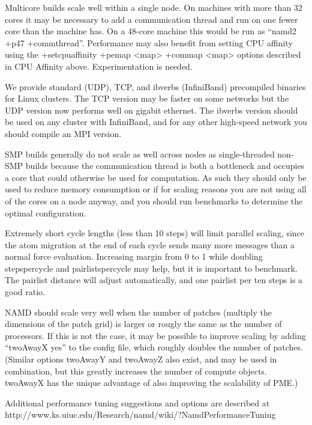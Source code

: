 Multicore builds scale well within a single node.  On machines with more
than 32 cores it may be necessary to add a communication thread and run
on one fewer core than the machine has.  On a 48-core machine this would
be run as ``namd2 +p47 +commthread''.  Performance may also benefit from
setting CPU affinity using the +setcpuaffinity +pemap <map> +commap <map>
options described in CPU Affinity above.  Experimentation is needed.

We provide standard (UDP), TCP, and ibverbs (InfiniBand) precompiled
binaries for Linux clusters.  The TCP version may be faster on some
networks but the UDP version now performs well on gigabit ethernet.
The ibverbs version should be used on any cluster with InfiniBand,
and for any other high-speed network you should compile an MPI version.

SMP builds generally do not scale as well across nodes as single-threaded
non-SMP builds because the communication thread is both a bottleneck and
occupies a core that could otherwise be used for computation.  As such
they should only be used to reduce memory consumption or if for scaling
reasons you are not using all of the cores on a node anyway, and you
should run benchmarks to determine the optimal configuration.

Extremely short cycle lengths (less than 10 steps) will limit parallel
scaling, since the atom migration at the end of each cycle sends many
more messages than a normal force evaluation.  Increasing margin from
0 to 1 while doubling stepspercycle and pairlistspercycle may help,
but it is important to benchmark.  The pairlist distance will adjust
automatically, and one pairlist per ten steps is a good ratio.

NAMD should scale very well when the number of patches (multiply the
dimensions of the patch grid) is larger or rougly the same as the
number of processors.  If this is not the case, it may be possible
to improve scaling by adding ``twoAwayX yes'' to the config file,
which roughly doubles the number of patches.  (Similar options
twoAwayY and twoAwayZ also exist, and may be used in combination,
but this greatly increases the number of compute objects.  twoAwayX
has the unique advantage of also improving the scalability of PME.)
  

Additional performance tuning suggestions and options are described
at http://www.ks.uiuc.edu/Research/namd/wiki/?NamdPerformanceTuning

